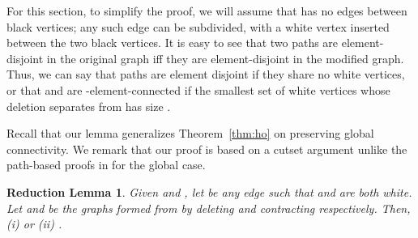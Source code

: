 \documentclass[11pt]{article}
\newtheorem*{redlem}{Reduction Lemma}
\begin{document}
For this section, to simplify the proof, we will assume that  has
no edges between black vertices; any such edge can be subdivided, with
a white vertex inserted between the two black vertices. It is easy to
see that two paths are element-disjoint in the original graph iff they
are element-disjoint in the modified graph. Thus, we can say that
paths are element disjoint if they share no white vertices, or that
 and  are -element-connected if the smallest set of white
vertices whose deletion separates  from  has size .

Recall that our lemma generalizes Theorem~\ref{thm:ho} on preserving
global connectivity. We remark that our proof is based on a cutset
argument unlike the path-based proofs in \cite{hind,cs} for the global
case.

\begin{redlem}
  Given  and , let  be any edge such that 
  and  are both white. Let  and  be the
  graphs formed from  by deleting and contracting 
  respectively. Then, 
  (i)  or 
  (ii) .
\end{redlem}
\vspace{0.1in}
\end{document}
